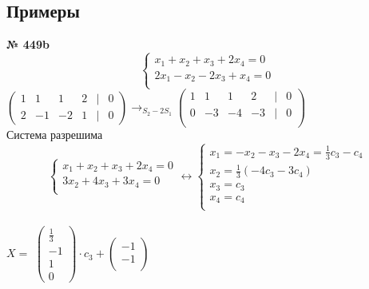\documentclass[12pt]{article}
\begin{document}
\newpage
\subsection{Примеры}

\vspace{.5cm}
{
	{\textbf{№ 449b} \vspace{.5cm}\\}
	\begin{equation*}
		\begin{cases*}
			x_1+x_2+x_3+2x_4=0\\
			2x_1-x_2-2x_3+x_4=0\\
		\end{cases*}
	\end{equation*}
\ensuremath{
	\begin{pmatrix}
		1 & 1 & 1 & 2 & | & 0\\
		2 & -1 & -2 & 1 & | & 0
	\end{pmatrix} \rightarrow_{S_2-2S_1}
	\begin{pmatrix}
		1 & 1 & 1 & 2 & | & 0\\
		0 & -3 & -4 & -3 & | & 0\\
	\end{pmatrix}
}\vspace{.5cm}\\
Система разрешима\\
	\begin{equation*}
	\begin{cases*}
		x_1+x_2+x_3+2x_4=0\\
		3x_2+4x_3+3x_4=0\\
	\end{cases*}
\leftrightarrow
	\begin{cases*}
	x_1=-x_2-x_3-2x_4=\frac{1}{3}c_3-c_4\\
	x_2 = \frac{1}{3}(-4c_3-3c_4)\\
	x_3=c_3\\
	x_4=c_4\\
\end{cases*}
\end{equation*}\\
$X = $
\ensuremath{
	\begin{pmatrix}
		\frac{1}{3}\\
		-1\\
		1\\
		0
	\end{pmatrix} \cdot c_3 +
	\begin{pmatrix}
	-1\\
	-1\\

\end{pmatrix}}}
\end{document}
